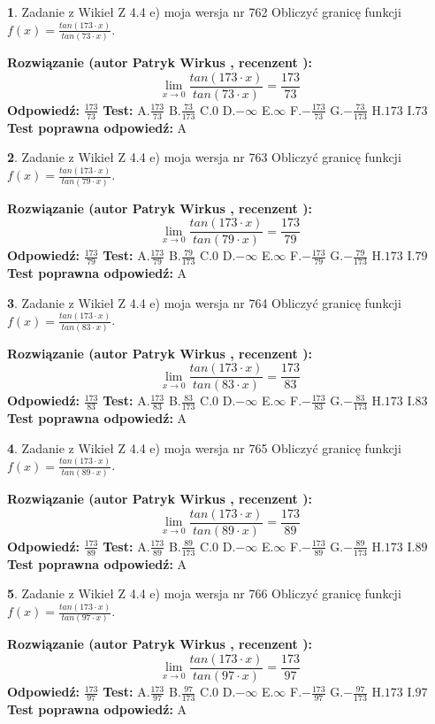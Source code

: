 \documentclass[12pt, a4paper]{article}
\theoremstyle{definition} %
\newtheorem{zad}{}
\newcommand{\zadStart}[1]{\begin{zad}#1\newline}
\newcommand{\zadStop}{\end{zad}}
\newcommand{\rozwStart}[2]{\noindent \textbf{Rozwiązanie (autor #1 , recenzent #2): }\newline}
\newcommand{\rozwStop}{\newline}
\newcommand{\odpStart}{\noindent \textbf{Odpowiedź:}\newline}
\newcommand{\odpStop}{\newline}
\newcommand{\testStart}{\noindent \textbf{Test:}\newline}
\newcommand{\testStop}{\newline}
\newcommand{\kluczStart}{\noindent \textbf{Test poprawna odpowiedź:}\newline}
\newcommand{\kluczStop}{\newline}
\begin{document}
\zadStart{Zadanie z Wikieł Z 4.4 e) moja wersja nr 762}
Obliczyć granicę funkcji $f(x)=\frac{tan(173\cdot x)}{tan(73\cdot x)}$.
\zadStop
\rozwStart{Patryk Wirkus}{}
$$\lim\limits_{x\to 0}\frac{tan(173\cdot x)}{tan(73\cdot x)}=
\frac{173}{73}$$
\rozwStop
\odpStart
$\frac{173}{73}$
\odpStop
\testStart
A.$\frac{173}{73}$
B.$\frac{73}{173}$
C.$0$
D.$-\infty$
E.$\infty$
F.$-\frac{173}{73}$
G.$-\frac{73}{173}$
H.$173$
I.$73$
\testStop
\kluczStart
A
\kluczStop



\zadStart{Zadanie z Wikieł Z 4.4 e) moja wersja nr 763}
Obliczyć granicę funkcji $f(x)=\frac{tan(173\cdot x)}{tan(79\cdot x)}$.
\zadStop
\rozwStart{Patryk Wirkus}{}
$$\lim\limits_{x\to 0}\frac{tan(173\cdot x)}{tan(79\cdot x)}=
\frac{173}{79}$$
\rozwStop
\odpStart
$\frac{173}{79}$
\odpStop
\testStart
A.$\frac{173}{79}$
B.$\frac{79}{173}$
C.$0$
D.$-\infty$
E.$\infty$
F.$-\frac{173}{79}$
G.$-\frac{79}{173}$
H.$173$
I.$79$
\testStop
\kluczStart
A
\kluczStop



\zadStart{Zadanie z Wikieł Z 4.4 e) moja wersja nr 764}
Obliczyć granicę funkcji $f(x)=\frac{tan(173\cdot x)}{tan(83\cdot x)}$.
\zadStop
\rozwStart{Patryk Wirkus}{}
$$\lim\limits_{x\to 0}\frac{tan(173\cdot x)}{tan(83\cdot x)}=
\frac{173}{83}$$
\rozwStop
\odpStart
$\frac{173}{83}$
\odpStop
\testStart
A.$\frac{173}{83}$
B.$\frac{83}{173}$
C.$0$
D.$-\infty$
E.$\infty$
F.$-\frac{173}{83}$
G.$-\frac{83}{173}$
H.$173$
I.$83$
\testStop
\kluczStart
A
\kluczStop



\zadStart{Zadanie z Wikieł Z 4.4 e) moja wersja nr 765}
Obliczyć granicę funkcji $f(x)=\frac{tan(173\cdot x)}{tan(89\cdot x)}$.
\zadStop
\rozwStart{Patryk Wirkus}{}
$$\lim\limits_{x\to 0}\frac{tan(173\cdot x)}{tan(89\cdot x)}=
\frac{173}{89}$$
\rozwStop
\odpStart
$\frac{173}{89}$
\odpStop
\testStart
A.$\frac{173}{89}$
B.$\frac{89}{173}$
C.$0$
D.$-\infty$
E.$\infty$
F.$-\frac{173}{89}$
G.$-\frac{89}{173}$
H.$173$
I.$89$
\testStop
\kluczStart
A
\kluczStop



\zadStart{Zadanie z Wikieł Z 4.4 e) moja wersja nr 766}
Obliczyć granicę funkcji $f(x)=\frac{tan(173\cdot x)}{tan(97\cdot x)}$.
\zadStop
\rozwStart{Patryk Wirkus}{}
$$\lim\limits_{x\to 0}\frac{tan(173\cdot x)}{tan(97\cdot x)}=
\frac{173}{97}$$
\rozwStop
\odpStart
$\frac{173}{97}$
\odpStop
\testStart
A.$\frac{173}{97}$
B.$\frac{97}{173}$
C.$0$
D.$-\infty$
E.$\infty$
F.$-\frac{173}{97}$
G.$-\frac{97}{173}$
H.$173$
I.$97$
\testStop
\kluczStart
A
\kluczStop
\end{document}
